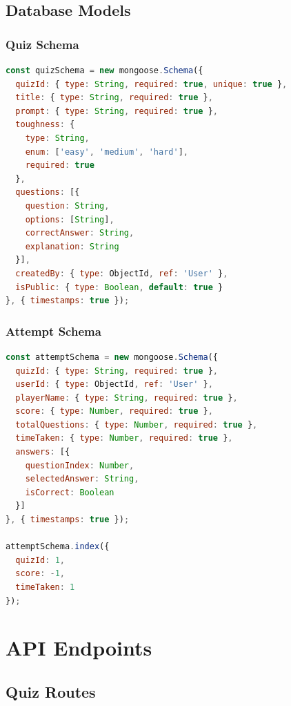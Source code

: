 \documentclass[12pt,a4paper]{article}
\begin{document}
\subsection{Database Models}

\subsubsection{Quiz Schema}
\begin{lstlisting}[language=JavaScript]
const quizSchema = new mongoose.Schema({
  quizId: { type: String, required: true, unique: true },
  title: { type: String, required: true },
  prompt: { type: String, required: true },
  toughness: { 
    type: String, 
    enum: ['easy', 'medium', 'hard'], 
    required: true 
  },
  questions: [{
    question: String,
    options: [String],
    correctAnswer: String,
    explanation: String
  }],
  createdBy: { type: ObjectId, ref: 'User' },
  isPublic: { type: Boolean, default: true }
}, { timestamps: true });
\end{lstlisting}

\subsubsection{Attempt Schema}
\begin{lstlisting}[language=JavaScript]
const attemptSchema = new mongoose.Schema({
  quizId: { type: String, required: true },
  userId: { type: ObjectId, ref: 'User' },
  playerName: { type: String, required: true },
  score: { type: Number, required: true },
  totalQuestions: { type: Number, required: true },
  timeTaken: { type: Number, required: true },
  answers: [{
    questionIndex: Number,
    selectedAnswer: String,
    isCorrect: Boolean
  }]
}, { timestamps: true });

attemptSchema.index({ 
  quizId: 1, 
  score: -1, 
  timeTaken: 1 
});
\end{lstlisting}

\newpage

\section{API Endpoints}

\subsection{Quiz Routes}
\end{document}
